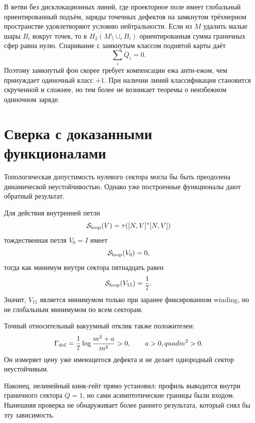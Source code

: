 В ветви без дисклокационных линий, где проекторное поле имеет глобальный
ориентированный подъём, заряды точечных дефектов на замкнутом
трёхмерном пространстве удовлетворяют условию нейтральности. Если из
$M$ удалить малые шары $B_i$ вокруг точек, то в
$H_2(M\setminus\cup_i B_i)$ ориентированная сумма граничных сфер равна
нулю. Спаривание с замкнутым классом поднятой карты даёт
\begin{equation}
 \sum_i Q_i=0.
 \label{eq:v5-sector-selection-charge-neutrality}
\end{equation}
Поэтому замкнутый фон скорее требует компенсации ежа анти-ежом, чем
принуждает одиночный класс $+1$. При наличии линий классификация становится
скрученной и сложнее, но тем более не возникает теоремы о неизбежном
одиночном заряде.

\section{Сверка с доказанными функционалами}

Топологическая допустимость нулевого сектора могла бы быть преодолена
динамической неустойчивостью. Однако уже построенные функционалы дают
обратный результат.

Для действия внутренней петли
\begin{equation}
 \mathcal S_{\rm loop}(V)=
 \tau\!\left([N,V]^*[N,V]\right)
\end{equation}
тождественная петля $V_0=I$ имеет
\begin{equation}
 \mathcal S_{\rm loop}(V_0)=0,
\end{equation}
тогда как минимум внутри сектора пятнадцать равен
\begin{equation}
 \mathcal S_{\rm loop}(V_{15})=\frac17.
 \label{eq:v5-sector-selection-loop-cost}
\end{equation}
Значит, $V_{15}$ является минимумом только при заранее фиксированном
winding, но не глобальным минимумом по всем секторам.

Точный относительный вакуумный отклик также положителен:
\begin{equation}
 \Gamma_{\rm def}
 =\frac17\log\frac{m^2+a}{m^2}>0,
 \qquad a>0,quad m^2>0.
 \label{eq:v5-sector-selection-positive-response}
\end{equation}
Он измеряет цену уже имеющегося дефекта и не делает однородный сектор
неустойчивым.

Наконец, нелинейный кинк-гейт прямо установил: профиль выводится внутри
граничного сектора $Q=1$, но сами асимптотические границы были входом.
Нынешняя проверка не обнаруживает более раннего результата, который снял
бы эту зависимость.

